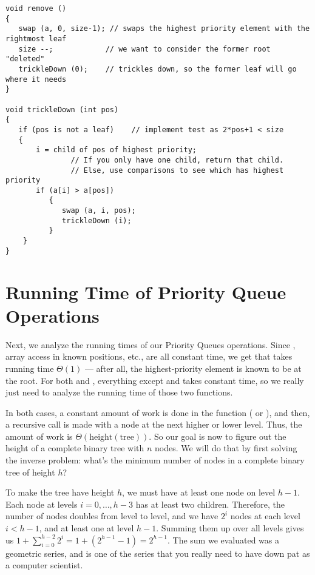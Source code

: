 \begin{description}
\begin{verbatim}
void remove ()
{
   swap (a, 0, size-1); // swaps the highest priority element with the rightmost leaf
   size --;            // we want to consider the former root "deleted"
   trickleDown (0);    // trickles down, so the former leaf will go where it needs
}		

void trickleDown (int pos) 
{ 
   if (pos is not a leaf)    // implement test as 2*pos+1 < size
   {
       i = child of pos of highest priority;
               // If you only have one child, return that child.
               // Else, use comparisons to see which has highest priority
       if (a[i] > a[pos]) 
          {
             swap (a, i, pos);
             trickleDown (i);
          } 
    }
}
\end{verbatim}
\end{description}

\section{Running Time of Priority Queue Operations}
\label{sec:priority-queues:running-time}

Next, we analyze the running times of our Priority Queues operations.
Since , array access in known positions,  etc.,
are all constant time, we get that  takes running time 
$\Theta(1)$ --- after all, the highest-priority element is known to be
at the root.
For both  and , everything except
 and  takes constant time, so we
really just need to analyze the running time of those two functions.

In both cases, a constant amount of work is done in the function
( or ), and then, a recursive
call is made with a node at the next higher or lower level. 
Thus, the amount of work is $\Theta(\mbox{height}(\mbox{tree}))$.
So our goal is now to figure out the height of a complete binary tree
with $n$ nodes. We will do that by first solving the inverse problem:
what's the minimum number of nodes in a complete binary tree of height
$h$?

To make the tree have height $h$, we must have at least one node on
level $h-1$. Each node at levels $i=0, \ldots, h-3$ has at least two
children. Therefore, the number of nodes doubles from level to level,
and we have $2^i$ nodes at each level $i < h-1$, and at least one at
level $h-1$. Summing them up over all levels gives us
$1 + \sum_{i=0}^{h-2} 2^i = 1 + (2^{h-1}-1) = 2^{h-1}$.
The sum we evaluated was a geometric series, and is one of the series
that you really need to have down pat as a computer scientist.

